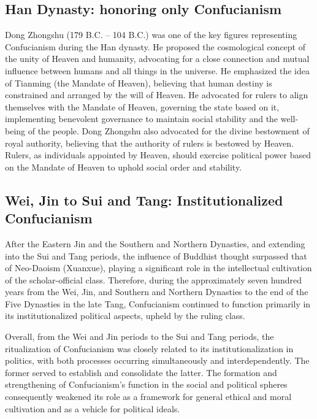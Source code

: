 \documentclass[
]{book}
\begin{document}
\hypertarget{han-dynasty-honoring-only-confucianism}{%
\subsection{Han Dynasty: honoring only Confucianism}\label{han-dynasty-honoring-only-confucianism}}

Dong Zhongshu (179 B.C. -- 104 B.C.) was one of the key figures representing Confucianism during the Han dynasty. He proposed the cosmological concept of the unity of Heaven and humanity, advocating for a close connection and mutual influence between humans and all things in the universe. He emphasized the idea of Tianming (the Mandate of Heaven), believing that human destiny is constrained and arranged by the will of Heaven. He advocated for rulers to align themselves with the Mandate of Heaven, governing the state based on it, implementing benevolent governance to maintain social stability and the well-being of the people. Dong Zhongshu also advocated for the divine bestowment of royal authority, believing that the authority of rulers is bestowed by Heaven. Rulers, as individuals appointed by Heaven, should exercise political power based on the Mandate of Heaven to uphold social order and stability.

\hypertarget{wei-jin-to-sui-and-tang-institutionalized-confucianism}{%
\subsection{Wei, Jin to Sui and Tang: Institutionalized Confucianism}\label{wei-jin-to-sui-and-tang-institutionalized-confucianism}}

After the Eastern Jin and the Southern and Northern Dynasties, and extending into the Sui and Tang periods, the influence of Buddhist thought surpassed that of Neo-Daoism (Xuanxue), playing a significant role in the intellectual cultivation of the scholar-official class. Therefore, during the approximately seven hundred years from the Wei, Jin, and Southern and Northern Dynasties to the end of the Five Dynasties in the late Tang, Confucianism continued to function primarily in its institutionalized political aspects, upheld by the ruling class.

Overall, from the Wei and Jin periods to the Sui and Tang periods, the ritualization of Confucianism was closely related to its institutionalization in politics, with both processes occurring simultaneously and interdependently. The former served to establish and consolidate the latter. The formation and strengthening of Confucianism's function in the social and political spheres consequently weakened its role as a framework for general ethical and moral cultivation and as a vehicle for political ideals.
\end{document}
